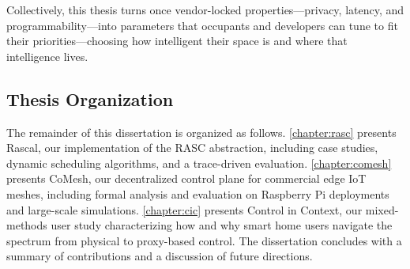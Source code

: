 Collectively, this thesis turns once vendor-locked properties---privacy, latency, and pro\-gram\-ma\-bil\-ity---into parameters that occupants and developers can tune to fit their pri\-or\-i\-ties---choosing how intelligent their space is and where that intelligence lives.


\subsection{Thesis Organization}
\label{intro:sec:organization}

The remainder of this dissertation is organized as follows. \ref{chapter:rasc} presents Rascal, our implementation of the RASC abstraction, including case studies, dynamic scheduling algorithms, and a trace-driven evaluation. \ref{chapter:comesh} presents CoMesh, our decentralized control plane for commercial edge IoT meshes, including formal analysis and evaluation on Raspberry Pi deployments and large-scale simulations. \ref{chapter:cic} presents Control in Context, our mixed-methods user study characterizing how and why smart home users navigate the spectrum from physical to proxy-based control. The dissertation concludes with a summary of contributions and a discussion of future directions.
